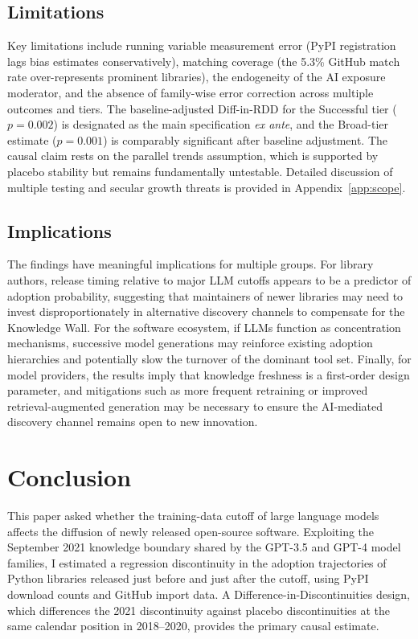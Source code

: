 \documentclass[12pt, a4paper]{report}
\begin{document}
\section{Limitations}\label{sec:disc-limitations}
Key limitations include running variable measurement error (PyPI registration lags bias estimates conservatively), matching coverage (the 5.3\% GitHub match rate over-represents prominent libraries), the endogeneity of the AI exposure moderator, and the absence of family-wise error correction across multiple outcomes and tiers. The baseline-adjusted Diff-in-RDD for the Successful tier ($p = 0.002$) is designated as the main specification \textit{ex ante}, and the Broad-tier estimate ($p = 0.001$) is comparably significant after baseline adjustment. The causal claim rests on the parallel trends assumption, which is supported by placebo stability but remains fundamentally untestable. Detailed discussion of multiple testing and secular growth threats is provided in Appendix~\ref{app:scope}.

\section{Implications}\label{sec:disc-implications}
The findings have meaningful implications for multiple groups. For library authors, release timing relative to major LLM cutoffs appears to be a predictor of adoption probability, suggesting that maintainers of newer libraries may need to invest disproportionately in alternative discovery channels to compensate for the Knowledge Wall. For the software ecosystem, if LLMs function as concentration mechanisms, successive model generations may reinforce existing adoption hierarchies and potentially slow the turnover of the dominant tool set. Finally, for model providers, the results imply that knowledge freshness is a first-order design parameter, and mitigations such as more frequent retraining or improved retrieval-augmented generation may be necessary to ensure the AI-mediated discovery channel remains open to new innovation.

\chapter{Conclusion}\label{ch:conclusion}

This paper asked whether the training-data cutoff of large language models affects the diffusion of newly released open-source software. Exploiting the September 2021 knowledge boundary shared by the GPT-3.5 and GPT-4 model families, I estimated a regression discontinuity in the adoption trajectories of Python libraries released just before and just after the cutoff, using PyPI download counts and GitHub import data. A Difference-in-Discontinuities design, which differences the 2021 discontinuity against placebo discontinuities at the same calendar position in 2018--2020, provides the primary causal estimate.
\end{document}
